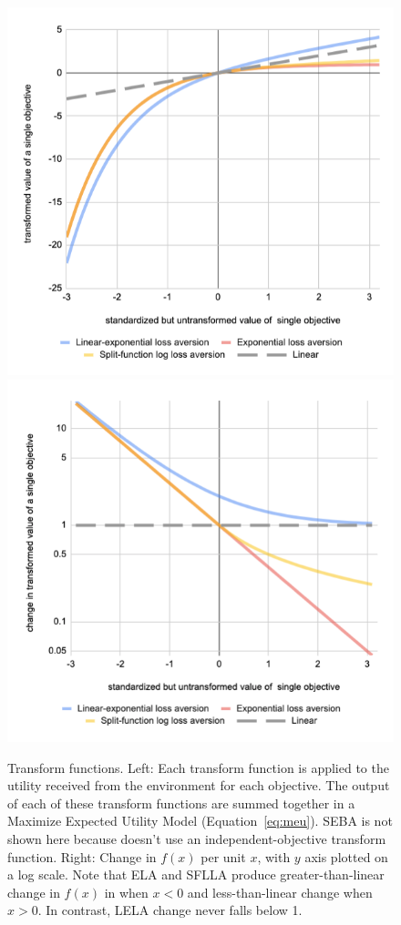 \begin{figure}[h]
 
  \includegraphics[width=\columnwidth]{output/transform_graph_2d.png}
  \includegraphics[width=\columnwidth]{output/transform_graph_2d_integral.png}
  \caption{Transform functions. Left: Each transform function is applied to the utility received from the environment for each objective. The output of each of these transform functions are summed together in a Maximize Expected Utility Model (Equation~\ref{eq:meu}). SEBA is not shown here because doesn't use an independent-objective transform function. Right: Change in $f(x)$ per unit $x$, with $y$ axis plotted on a log scale. Note that ELA and SFLLA produce greater-than-linear change in $f(x)$ in when $x<0$ and less-than-linear change when $x>0$. In contrast, LELA change never falls below 1.}
  \label{fig:transform_functions}
\end{figure}
